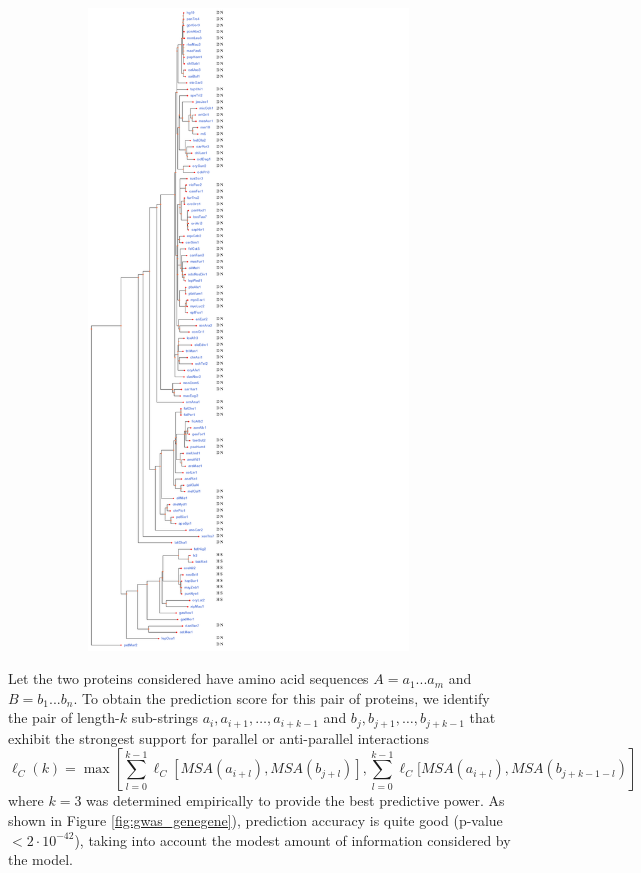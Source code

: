 \begin{figure}[p]
\begin{subfigure}[t]{.2\textwidth}
  \includegraphics[height=17cm]{figs/gwas_figure_4_tree_coevolution.png}
  \label{fig:sub2}
\end{subfigure}
\label{fig:gwas_jmol}
\end{figure}

Let the two proteins considered have amino acid sequences $A = a_1...a_m$ and $B = b_1...b_n$. 
To obtain the prediction score for this pair of proteins, we identify the pair of length-$k$ sub-strings $a_i, a_{i+1}, …, a_{i+k-1}$ and $b_j, b_{j+1}, …, b_{j+k-1}$ that exhibit the strongest support for parallel or anti-parallel interactions
\[
\ell_C(k) = \max\left[ \sum_{l=0}^{k-1}{ \ell_C[ MSA(a_{i+l}) , MSA(b_{j+l}) ]},  \sum_{l=0}^{k-1}{\ell_C[ MSA(a_{i+l}) , MSA(b_{j+k-1-l})} \right]
\]
\noindent where $k=3$ was determined empirically to provide the best predictive power. 
As shown in Figure \ref{fig:gwas_genegene}), prediction accuracy is quite good (p-value $< 2 \cdot 10^{-42}$), taking into account the modest amount of information considered by the model.


